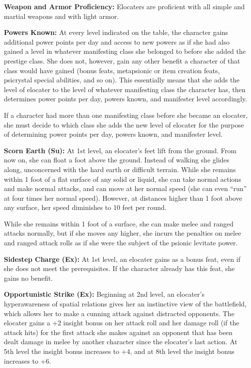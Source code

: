 {
\textbf{Weapon and Armor Proficiency:} Elocaters are proficient with all simple and martial weapons and with light armor.

\textbf{Powers Known:} At every level indicated on the table, the character gains additional power points per day and access to new powers as if she had also gained a level in whatever manifesting class she belonged to before she added the prestige class. She does not, however, gain any other benefit a character of that class would have gained (bonus feats, metapsionic or item creation feats, psicrystal special abilities, and so on). This essentially means that she adds the level of elocater to the level of whatever manifesting class the character has, then determines power points per day, powers known, and manifester level accordingly.

If a character had more than one manifesting class before she became an elocater, she must decide to which class she adds the new level of elocater for the purpose of determining power points per day, powers known, and manifester level.

\textbf{Scorn Earth (Su):} At 1st level, an elocater's feet lift from the ground. From now on, she can float a foot above the ground. Instead of walking she glides along, unconcerned with the hard earth or difficult terrain. While she remains within 1 foot of a flat surface of any solid or liquid, she can take normal actions and make normal attacks, and can move at her normal speed (she can even “run” at four times her normal speed). However, at distances higher than 1 foot above any surface, her speed diminishes to 10 feet per round.

While she remains within 1 foot of a surface, she can make melee and ranged attacks normally, but if she moves any higher, she incurs the penalties on melee and ranged attack rolls as if she were the subject of the psionic levitate power.

\textbf{Sidestep Charge (Ex):} At 1st level, an elocater gains  as a bonus feat, even if she does not meet the prerequisites. If the character already has this feat, she gains no benefit.

\textbf{Opportunistic Strike (Ex):} Beginning at 2nd level, an elocater's hyperawareness of spatial relations gives her an instinctive view of the battlefield, which allows her to make a cunning attack against distracted opponents. The elocater gains a +2 insight bonus on her attack roll and her damage roll (if the attack hits) for the first attack she makes against an opponent that has been dealt damage in melee by another character since the elocater's last action. At 5th level the insight bonus increases to +4, and at 8th level the insight bonus increases to +6.

}
